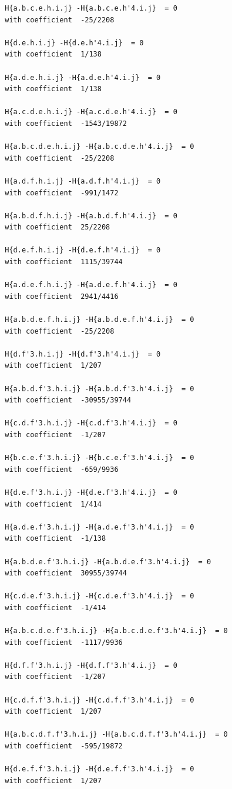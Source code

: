 \documentclass[11pt, a4paper]{kybernetika}
\begin{document}
\begin{verbatim}
		H{a.b.c.e.h.i.j} -H{a.b.c.e.h'4.i.j}  = 0
		with coefficient  -25/2208
		
		H{d.e.h.i.j} -H{d.e.h'4.i.j}  = 0
		with coefficient  1/138
		
		H{a.d.e.h.i.j} -H{a.d.e.h'4.i.j}  = 0
		with coefficient  1/138
		
		H{a.c.d.e.h.i.j} -H{a.c.d.e.h'4.i.j}  = 0
		with coefficient  -1543/19872
		
		H{a.b.c.d.e.h.i.j} -H{a.b.c.d.e.h'4.i.j}  = 0
		with coefficient  -25/2208
		
		H{a.d.f.h.i.j} -H{a.d.f.h'4.i.j}  = 0
		with coefficient  -991/1472
		
		H{a.b.d.f.h.i.j} -H{a.b.d.f.h'4.i.j}  = 0
		with coefficient  25/2208
		
		H{d.e.f.h.i.j} -H{d.e.f.h'4.i.j}  = 0
		with coefficient  1115/39744
		
		H{a.d.e.f.h.i.j} -H{a.d.e.f.h'4.i.j}  = 0
		with coefficient  2941/4416
		
		H{a.b.d.e.f.h.i.j} -H{a.b.d.e.f.h'4.i.j}  = 0
		with coefficient  -25/2208
		
		H{d.f'3.h.i.j} -H{d.f'3.h'4.i.j}  = 0
		with coefficient  1/207
		
		H{a.b.d.f'3.h.i.j} -H{a.b.d.f'3.h'4.i.j}  = 0
		with coefficient  -30955/39744
		
		H{c.d.f'3.h.i.j} -H{c.d.f'3.h'4.i.j}  = 0
		with coefficient  -1/207
		
		H{b.c.e.f'3.h.i.j} -H{b.c.e.f'3.h'4.i.j}  = 0
		with coefficient  -659/9936
		
		H{d.e.f'3.h.i.j} -H{d.e.f'3.h'4.i.j}  = 0
		with coefficient  1/414
		
		H{a.d.e.f'3.h.i.j} -H{a.d.e.f'3.h'4.i.j}  = 0
		with coefficient  -1/138
		
		H{a.b.d.e.f'3.h.i.j} -H{a.b.d.e.f'3.h'4.i.j}  = 0
		with coefficient  30955/39744
		
		H{c.d.e.f'3.h.i.j} -H{c.d.e.f'3.h'4.i.j}  = 0
		with coefficient  -1/414
		
		H{a.b.c.d.e.f'3.h.i.j} -H{a.b.c.d.e.f'3.h'4.i.j}  = 0
		with coefficient  -1117/9936
		
		H{d.f.f'3.h.i.j} -H{d.f.f'3.h'4.i.j}  = 0
		with coefficient  -1/207
		
		H{c.d.f.f'3.h.i.j} -H{c.d.f.f'3.h'4.i.j}  = 0
		with coefficient  1/207
		
		H{a.b.c.d.f.f'3.h.i.j} -H{a.b.c.d.f.f'3.h'4.i.j}  = 0
		with coefficient  -595/19872
		
		H{d.e.f.f'3.h.i.j} -H{d.e.f.f'3.h'4.i.j}  = 0
		with coefficient  1/207
		

\end{verbatim}
\end{document}
